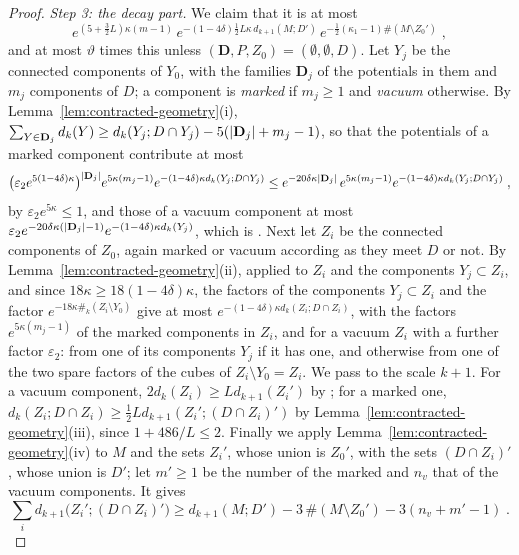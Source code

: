 \documentclass[11pt]{preprint}
\DeclarePairedDelimiter{\abs}{\lvert}{\rvert}
\numberwithin{equation}{section}
\theoremstyle{definition}
\theoremstyle{remark}
\theoremstyle{plain}
\begin{document}
\begin{proof}
\emph{Step 3: the decay part.} We claim that it is at most
\begin{equation}\label{eq:marked-decay}
    e^{(5 + \frac32L)\kappa(m - 1)}\,e^{-(1 - 4\delta)\frac12L\kappa\,d_{k+1}(M; D')}\,e^{-\frac12(\kappa_1 - 1)\#(M \setminus Z_0')}\;,
\end{equation}
and at most $\vartheta$ times this unless $(\mathbf D, P, Z_0) = (\emptyset, \emptyset, D)$. Let $Y_j$ be the connected components of $Y_0$, with the families $\mathbf D_j$ of the potentials in them and $m_j$ components of $D$; a component is \emph{marked} if $m_j \geq 1$ and \emph{vacuum} otherwise. By Lemma~\ref{lem:contracted-geometry}(i), $\sum_{Y \in \mathbf D_j}d_k(Y) \geq d_k(Y_j; D \cap Y_j) - 5(\abs{\mathbf D_j} + m_j - 1)$, so that the potentials of a marked component contribute at most
\[
    \bigl(\varepsilon_2e^{5(1 - 4\delta)\kappa}\bigr)^{\abs{\mathbf D_j}}e^{5\kappa(m_j - 1)}e^{-(1 - 4\delta)\kappa d_k(Y_j; D \cap Y_j)} \leq e^{-20\delta\kappa\abs{\mathbf D_j}}\,e^{5\kappa(m_j - 1)}e^{-(1 - 4\delta)\kappa d_k(Y_j; D \cap Y_j)}\;,
\]
by $\varepsilon_2e^{5\kappa} \leq 1$, and those of a vacuum component at most $\varepsilon_2e^{-20\delta\kappa(\abs{\mathbf D_j} - 1)}e^{-(1 - 4\delta)\kappa d_k(Y_j)}$, which is \cite[(2.28)]{BalabanRG2}. Next let $Z_i$ be the connected components of $Z_0$, again marked or vacuum according as they meet $D$ or not. By Lemma~\ref{lem:contracted-geometry}(ii), applied to $Z_i$ and the components $Y_j \subset Z_i$, and since $18\kappa \geq 18(1 - 4\delta)\kappa$, the factors of the components $Y_j \subset Z_i$ and the factor $e^{-18\kappa\#_k(Z_i \setminus Y_0)}$ give at most $e^{-(1 - 4\delta)\kappa d_k(Z_i; D \cap Z_i)}$, with the factors $e^{5\kappa(m_j - 1)}$ of the marked components in $Z_i$, and for a vacuum $Z_i$ with a further factor $\varepsilon_2$: from one of its components $Y_j$ if it has one, and otherwise from one of the two spare factors of the cubes of $Z_i \setminus Y_0 = Z_i$. We pass to the scale $k + 1$. For a vacuum component, $2d_k(Z_i) \geq Ld_{k+1}(Z_i')$ by \cite[(2.36), p.~19]{BalabanRG2}; for a marked one, $d_k(Z_i; D \cap Z_i) \geq \frac12Ld_{k+1}(Z_i'; (D \cap Z_i)')$ by Lemma~\ref{lem:contracted-geometry}(iii), since $1 + 486/L \leq 2$. Finally we apply Lemma~\ref{lem:contracted-geometry}(iv) to $M$ and the sets $Z_i'$, whose union is $Z_0'$, with the sets $(D \cap Z_i)'$, whose union is $D'$; let $m' \geq 1$ be the number of the marked and $n_v$ that of the vacuum components. It gives
\[
    \sum_id_{k+1}\bigl(Z_i'; (D \cap Z_i)'\bigr) \geq d_{k+1}(M; D') - 3\,\#(M \setminus Z_0') - 3(n_v + m' - 1)\;.
\]
\end{proof}
\end{document}
